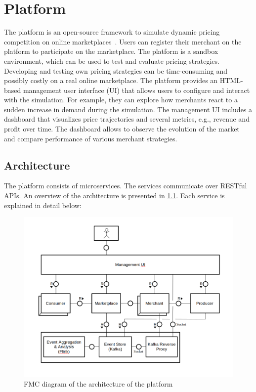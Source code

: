 
\chapter{\pricewars Platform}

The \pricewars platform is an open-source framework to simulate dynamic pricing competition on online marketplaces~\cite{DBLP:conf/recsys/0001SPSBLLSU17, edoc2017pricewars}.
Users can register their merchant on the platform to participate on the marketplace.
The platform is a sandbox environment, which can be used to test and evaluate pricing strategies. %
Developing and testing own pricing strategies can be time-consuming and possibly costly on a real online marketplace.
The platform provides an HTML-based management user interface (UI) that allows users to configure and interact with the simulation.
For example, they can explore how merchants react to a sudden increase in demand during the simulation.
The management UI includes a dashboard that visualizes price trajectories and several metrics, e.g., revenue and profit over time.
The dashboard allows to observe the evolution of the market and compare performance of various merchant strategies.

\section{Architecture}
The \pricewars platform consists of microservices.
The services communicate over RESTful APIs.
An overview of the architecture is presented in \cref{fig:platform_architecture}.
Each service is explained in detail below:

\begin{figure}
	\centering
	\includegraphics[width=\textwidth]{figures/architecture_placeholder.png}
	\caption[see this in list of figures]
	{FMC diagram of the architecture of the \pricewars platform}
	\label{fig:platform_architecture}
\end{figure}

